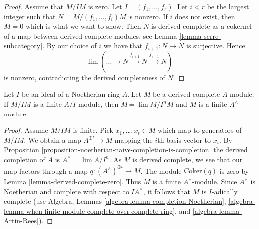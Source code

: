 \begin{proof}
Assume that $M/IM$ is zero. Let $I = (f_1, \ldots, f_r)$.
Let $i < r$ be the largest integer such that $N = M/(f_1, \ldots, f_i)M$
is nonzero. If $i$ does not exist, then $M = 0$ which is what we
want to show. Then $N$ is derived complete as a cokernel
of a map between derived complete modules, see
Lemma \ref{lemma-serre-subcategory}.
By our choice of $i$ we have that $f_{i + 1} : N \to N$ is surjective.
Hence
$$
\lim (\ldots \to N \xrightarrow{f_{i + 1}} N \xrightarrow{f_{i + 1}} N)
$$
is nonzero, contradicting the derived completeness of $N$.
\end{proof}

\begin{lemma}
\label{lemma-derived-complete-finite}
Let $I$ be an ideal of a Noetherian ring $A$.
Let $M$ be a derived complete $A$-module.
If $M/IM$ is a finite $A/I$-module, then
$M = \lim M/I^nM$ and $M$ is a finite $A^\wedge$-module.
\end{lemma}

\begin{proof}
Assume $M/IM$ is finite. Pick $x_1, \ldots, x_t \in M$ which map to
generators of $M/IM$. We obtain a map $A^{\oplus t} \to M$ mapping
the $i$th basis vector to $x_i$. By
Proposition \ref{proposition-noetherian-naive-completion-is-completion}
the derived completion
of $A$ is $A^\wedge = \lim A/I^n$. As $M$ is derived complete, we
see that our map factors through a map $q : (A^\wedge)^{\oplus t} \to M$.
The module $\text{Coker}(q)$ is zero by
Lemma \ref{lemma-derived-complete-zero}.
Thus $M$ is a finite $A^\wedge$-module.
Since $A^\wedge$ is Noetherian and complete with respect to $IA^\wedge$,
it follows that $M$ is $I$-adically complete (use
Algebra, Lemmas \ref{algebra-lemma-completion-Noetherian},
\ref{algebra-lemma-when-finite-module-complete-over-complete-ring}, and
\ref{algebra-lemma-Artin-Rees}).
\end{proof}

